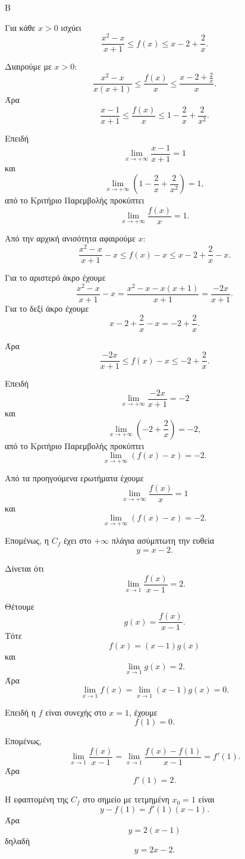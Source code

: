 
\begin{thema}{Β}
\begin{erwthma}
\item Για κάθε $x>0$ ισχύει
\[
\frac{x^2-x}{x+1}\leq f(x)\leq x-2+\frac{2}{x}.
\]

Διαιρούμε με $x>0$:
\[
\frac{x^2-x}{x(x+1)}\leq \frac{f(x)}{x}\leq
\frac{x-2+\frac{2}{x}}{x}.
\]
Άρα
\[
\frac{x-1}{x+1}\leq \frac{f(x)}{x}\leq
1-\frac{2}{x}+\frac{2}{x^2}.
\]

Επειδή
\[
\lim_{x\to+\infty}\frac{x-1}{x+1}=1
\]
και
\[
\lim_{x\to+\infty}\left(1-\frac{2}{x}+\frac{2}{x^2}\right)=1,
\]
από το Κριτήριο Παρεμβολής προκύπτει
\[
\lim_{x\to+\infty}\frac{f(x)}{x}=1.
\]

\item Από την αρχική ανισότητα αφαιρούμε $x$:
\[
\frac{x^2-x}{x+1}-x\leq f(x)-x\leq x-2+\frac{2}{x}-x.
\]

Για το αριστερό άκρο έχουμε
\[
\frac{x^2-x}{x+1}-x
=\frac{x^2-x-x(x+1)}{x+1}
=\frac{-2x}{x+1}.
\]
Για το δεξί άκρο έχουμε
\[
x-2+\frac{2}{x}-x=-2+\frac{2}{x}.
\]

Άρα
\[
\frac{-2x}{x+1}\leq f(x)-x\leq -2+\frac{2}{x}.
\]

Επειδή
\[
\lim_{x\to+\infty}\frac{-2x}{x+1}=-2
\]
και
\[
\lim_{x\to+\infty}\left(-2+\frac{2}{x}\right)=-2,
\]
από το Κριτήριο Παρεμβολής προκύπτει
\[
\lim_{x\to+\infty}(f(x)-x)=-2.
\]

\item Από τα προηγούμενα ερωτήματα έχουμε
\[
\lim_{x\to+\infty}\frac{f(x)}{x}=1
\]
και
\[
\lim_{x\to+\infty}(f(x)-x)=-2.
\]

Επομένως, η $C_f$ έχει στο $+\infty$ πλάγια ασύμπτωτη την ευθεία
\[
y=x-2.
\]

\item Δίνεται ότι
\[
\lim_{x\to 1}\frac{f(x)}{x-1}=2.
\]

Θέτουμε
\[
g(x)=\frac{f(x)}{x-1}.
\]
Τότε
\[
f(x)=(x-1)g(x)
\]
και
\[
\lim_{x\to 1}g(x)=2.
\]
Άρα
\[
\lim_{x\to 1}f(x)=\lim_{x\to 1}(x-1)g(x)=0.
\]

Επειδή η $f$ είναι συνεχής στο $x=1$, έχουμε
\[
f(1)=0.
\]

Επομένως,
\[
\lim_{x\to 1}\frac{f(x)}{x-1}
=\lim_{x\to 1}\frac{f(x)-f(1)}{x-1}
=f'(1).
\]
Άρα
\[
f'(1)=2.
\]

Η εφαπτομένη της $C_f$ στο σημείο με τετμημένη $x_0=1$ είναι
\[
y-f(1)=f'(1)(x-1).
\]
Άρα
\[
y=2(x-1)
\]
δηλαδή
\[
y=2x-2.
\]
\end{erwthma}
\end{thema}

